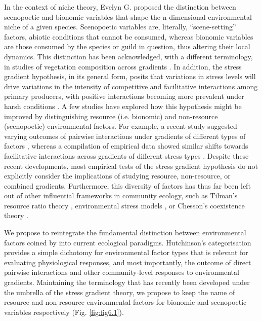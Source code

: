 In the context of niche theory, Evelyn G. \cite{Hutchinson1978} proposed the distinction between scenopoetic and bionomic variables that shape the n-dimensional environmental niche of a given species. Scenopoetic variables are, literally, “scene-setting” factors, abiotic conditions that cannot be consumed, whereas bionomic variables are those consumed by the species or guild in question, thus altering their local dynamics. This distinction has been acknowledged, with a different terminology, in studies of vegetation composition across gradients \citep{Austin1990}. In addition, the stress gradient hypothesis, in its general form, posits that variations in stress levels will drive variations in the intensity of competitive and facilitative interactions among primary producers, with positive interactions becoming more prevalent under harsh conditions \citep{Bertness1994}. A few studies have explored how this hypothesis might be improved by distinguishing resource (i.e. bionomic) and non-resource (scenopoetic) environmental factors. For example, a recent study suggested varying outcomes of pairwise interactions under gradients of different types of factors \citep{Maestre2009}, whereas a compilation of empirical data showed similar shifts towards facilitative interactions across gradients of different stress types \citep{He2013}. Despite these recent developments, most empirical tests of the stress gradient hypothesis do not explicitly consider the implications of studying resource, non-resource, or combined gradients. Furthermore, this diversity of factors has thus far been left out of other influential frameworks in community ecology, such as Tilman’s resource ratio theory \citep{Tilman1980, Miller2005}, environmental stress models \citep{Menge1987}, or Chesson’s coexistence theory \citep{Chesson2000}.

We propose to reintegrate the fundamental distinction between environmental factors coined by \cite{Hutchinson1978} into current ecological paradigms. Hutchinson’s categorisation provides a simple dichotomy for environmental factor types that is relevant for evaluating physiological responses, and most importantly, the outcome of direct pairwise interactions and other community-level responses to environmental gradients. Maintaining the terminology that has recently been developed under the umbrella of the stress gradient theory, we propose to keep the name of resource and non-resource environmental factors for bionomic and scenopoetic variables respectively (Fig. \ref{fig:fig6.1}).

